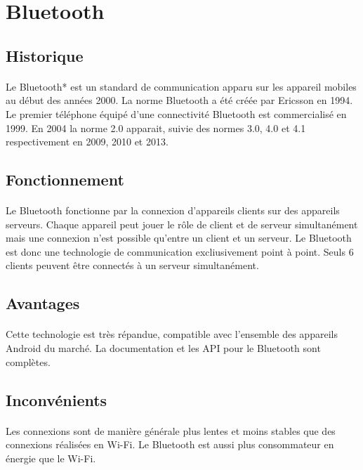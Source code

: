 \documentclass[a4paper,10pt]{report}
\begin{document}
  \section{Bluetooth}
    \subsection{Historique}
    \paragraph{}
    Le Bluetooth* est un standard de communication apparu sur les appareil mobiles au début des années 2000. La norme Bluetooth a été créée par Ericsson en 1994. Le premier téléphone équipé d'une connectivité Bluetooth est commercialisé en 1999. En 2004 la norme 2.0 apparait, suivie des normes 3.0, 4.0 et 4.1 respectivement en 2009, 2010 et 2013.
     \subsection{Fonctionnement}
    \paragraph{}
    Le Bluetooth fonctionne par la connexion d'appareils clients sur des appareils serveurs. Chaque appareil peut jouer le rôle de client et de serveur simultanément mais une connexion n'est possible qu'entre un client et un serveur. Le Bluetooth est donc une technologie de communication excliusivement point à point. Seuls 6 clients peuvent être connectés à un serveur simultanément.
     \subsection{Avantages}
    \paragraph{}
    Cette technologie est très répandue, compatible avec l'ensemble des appareils Android du marché. La documentation et les API pour le Bluetooth sont complètes.
     \subsection{Inconvénients}
    \paragraph{}
     Les connexions sont de manière générale plus lentes et moins stables que des connexions réalisées en Wi-Fi. Le Bluetooth est aussi plus consommateur en énergie que le Wi-Fi.
\end{document}
